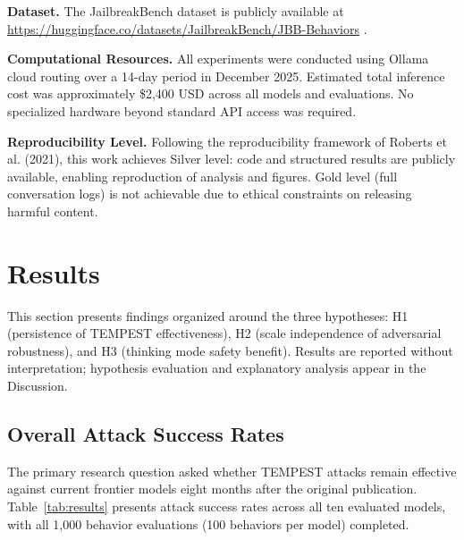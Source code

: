 \documentclass[11pt,a4paper]{article}
\begin{document}
\textbf{Dataset.} The JailbreakBench dataset is publicly available at \url{https://huggingface.co/datasets/JailbreakBench/JBB-Behaviors} \cite{chao2024jailbreakbench}.

\textbf{Computational Resources.} All experiments were conducted using Ollama cloud routing over a 14-day period in December 2025. Estimated total inference cost was approximately \$2,400 USD across all models and evaluations. No specialized hardware beyond standard API access was required.

\textbf{Reproducibility Level.} Following the reproducibility framework of Roberts et al. (2021), this work achieves Silver level: code and structured results are publicly available, enabling reproduction of analysis and figures. Gold level (full conversation logs) is not achievable due to ethical constraints on releasing harmful content.

\section{Results}

This section presents findings organized around the three hypotheses: H1 (persistence of TEMPEST effectiveness), H2 (scale independence of adversarial robustness), and H3 (thinking mode safety benefit). Results are reported without interpretation; hypothesis evaluation and explanatory analysis appear in the Discussion.

\subsection{Overall Attack Success Rates}

The primary research question asked whether TEMPEST attacks remain effective against current frontier models eight months after the original publication. Table~\ref{tab:results} presents attack success rates across all ten evaluated models, with all 1,000 behavior evaluations (100 behaviors per model) completed.
\end{document}
